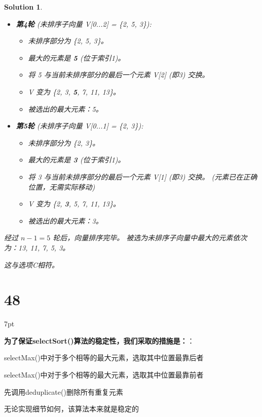 \documentclass[UTF8]{report}
\newtheorem{solution}{Solution}
\theoremstyle{MyLineTheoremStyle} %
\theoremstyle{MyBlockTheoremStyle} %
\theoremstyle{MySubsubsectionStyle} %
\newenvironment{graybox}{%
        \def\FrameCommand{%
        \hspace{1pt}%
        {\color{gray}\small \vrule width 2pt}%
        {\color{graybox_color}\vrule width 4pt}%
        \colorbox{graybox_color}%
        }%
        \MakeFramed{\advance\hsize-\width\FrameRestore}%
        \noindent\hspace{-4.55pt}%
        \begin{adjustwidth}{}{7pt}%
        \vspace{2pt}\vspace{2pt}%
        }
        {%
        \vspace{2pt}\end{adjustwidth}\endMakeFramed%
        }
\begin{document}
\begin{solution}
\begin{itemize}
    \item \textbf{第4轮} (未排序子向量 V[0...2] = \{2, 5, 3\}):
    \begin{itemize}
        \item 未排序部分为 \{2, 5, 3\}。
        \item 最大的元素是 \textbf{5} (位于索引1)。
        \item 将 5 与当前未排序部分的最后一个元素 V[2] (即3) 交换。
        \item V 变为 \{2, 3, \textbf{5}, 7, 11, 13\}。
        \item 被选出的最大元素：5。
    \end{itemize}

    \item \textbf{第5轮} (未排序子向量 V[0...1] = \{2, 3\}):
    \begin{itemize}
        \item 未排序部分为 \{2, 3\}。
        \item 最大的元素是 \textbf{3} (位于索引1)。
        \item 将 3 与当前未排序部分的最后一个元素 V[1] (即3) 交换。 (元素已在正确位置，无需实际移动)
        \item V 变为 \{2, \textbf{3}, 5, 7, 11, 13\}。
        \item 被选出的最大元素：3。
    \end{itemize}
\end{itemize}
经过 $n-1 = 5$ 轮后，向量排序完毕。
被选为未排序子向量中最大的元素依次为：13, 11, 7, 5, 3。

这与选项C相符。
\end{solution}




\section*{48}

\begin{graybox}
\textbf{为了保证selectSort()算法的稳定性，我们采取的措施是：}：
\begin{circledenum}
    \item selectMax()中对于多个相等的最大元素，选取其中位置最靠后者
    \item selectMax()中对于多个相等的最大元素，选取其中位置最靠前者
    \item 先调用deduplicate()删除所有重复元素
    \item 无论实现细节如何，该算法本来就是稳定的
\end{circledenum}
\end{graybox}
\end{document}
